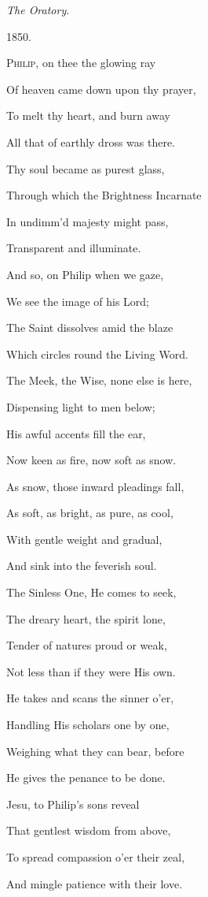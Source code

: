 \emph{The Oratory}.

1850.


P\textsc{hilip}, on thee the glowing ray

Of heaven came down upon thy prayer,

To melt thy heart, and burn away

All that of earthly dross was there.

Thy soul became as purest glass,

Through which the Brightness Incarnate

In undimm'd majesty might pass,

Transparent and illuminate.

And so, on Philip when we gaze,

We see the image of his Lord;

The Saint dissolves amid the blaze

Which circles round the Living Word.

The Meek, the Wise, none else is here,

Dispensing light to men below;

His awful accents fill the ear,

Now keen as fire, now soft as snow.

As snow, those inward pleadings fall,

As soft, as bright, as pure, as cool,

With gentle weight and gradual,

And sink into the feverish soul.

The Sinless One, He comes to seek,

The dreary heart, the spirit lone,

Tender of natures proud or weak,

Not less than if they were His own.

He takes and scans the sinner o'er,

Handling His scholars one by one,

Weighing what they can bear, before

He gives the penance to be done.

Jesu, to Philip's sons reveal

That gentlest wisdom from above,

To spread compassion o'er their zeal,

And mingle patience with their love.

